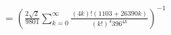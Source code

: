 \documentclass[preview]{standalone}
\begin{document}
\begin{align*}
= \left(\frac{2\sqrt{2}}{9801} \sum_{k=0}^{\infty} \frac{(4k)!(1103+26390k)}{(k!)^4 396^{4k}}\right)^{-1}
\end{align*}
\end{document}

